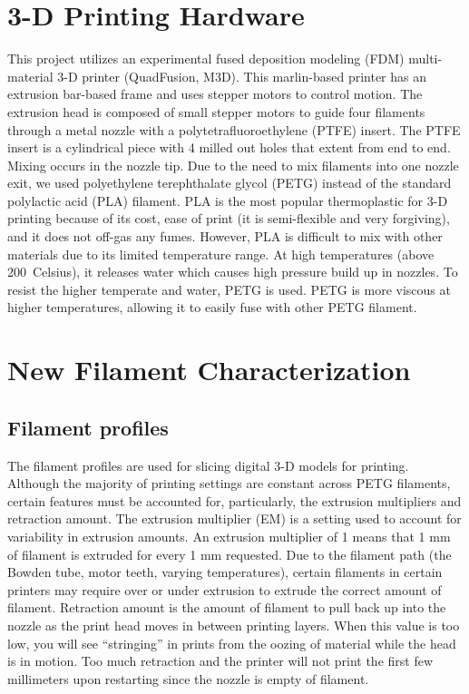 \section{3-D Printing Hardware}
This project utilizes an experimental fused deposition modeling (FDM) multi-material 3-D printer (QuadFusion, M3D). This marlin-based printer has an extrusion bar-based frame and uses stepper motors to control motion. The extrusion head is composed of small stepper motors to guide four filaments through a metal nozzle with a polytetrafluoroethylene (PTFE) insert. The PTFE insert is a cylindrical piece with 4 milled out holes that extent from end to end. Mixing occurs in the nozzle tip. Due to the need to mix filaments into one nozzle exit, we used polyethylene terephthalate glycol (PETG) instead of the standard polylactic acid (PLA) filament. PLA is the most popular thermoplastic for 3-D printing because of its cost, ease of print (it is semi-flexible and very forgiving), and it does not off-gas any fumes. However, PLA is difficult to mix with other materials due to its limited temperature range. At high temperatures (above 200\textdegree~Celsius), it releases water which causes high pressure build up in nozzles. To resist the higher temperate and water, PETG is used. PETG is more viscous at higher temperatures, allowing it to easily fuse with other PETG filament. 


\section{New Filament Characterization}
\subsection{Filament profiles}
The filament profiles are used for slicing digital 3-D models for printing. Although the majority of printing settings are constant across PETG filaments, certain features must be accounted for, particularly, the extrusion multipliers and retraction amount. The extrusion multiplier (EM) is a setting used to account for variability in extrusion amounts. An extrusion multiplier of 1 means that 1 mm of filament is extruded for every 1 mm requested. Due to the filament path (the Bowden tube, motor teeth, varying temperatures), certain filaments in certain printers may require over or under extrusion to extrude the correct amount of filament. Retraction amount is the amount of filament to pull back up into the nozzle as the print head moves in between printing layers. When this value is too low, you will see ``stringing'' in prints from the oozing of material while the head is in motion. Too much retraction and the printer will not print the first few millimeters upon restarting since the nozzle is empty of filament.

